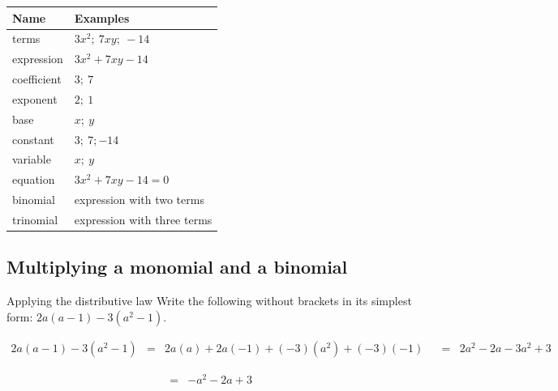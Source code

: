 \begin{table}[H]
\begin{center}
\begin{tabular}{|l|l|}
\hline
\textbf{Name} & \textbf{Examples} \\
\hline
terms & $3x^2;~ 7xy;~ -14$\\ \hline
expression & $3x^2 + 7xy -14$\\ \hline
coefficient & $3;~7$\\ \hline
exponent & $2;~1$\\ \hline
base & $x;~y$\\ \hline
constant & $3;~7;-14$\\ \hline
variable & $x;~ y$\\ \hline
equation & $3x^2 + 7xy -14 = 0$\\ \hline
binomial & expression with two terms\\ \hline
trinomial & expression with three terms \\ \hline


\end{tabular}
\end{center}
\end{table} 

\par

\subsection*{Multiplying a monomial and a binomial}

\begin{wex}{Applying the distributive law}
{Write the following without brackets in its simplest form: $2a(a-1) - 3(a^{2}-1).$}
{
\begin{equation*}
\begin{array}{lll} 2a(a-1) -3(a^{2}-1) &=& 2a(a) + 2a(-1) + (-3)(a^{2})+(-3)(-1) &
&=& 2a^{2} - 2a - 3a^{2} + 3
\end{array}
\end{equation*}

\begin{equation*}
\begin{array}{lll} &=& -a^{2} -2a + 3 & 
\end{array}
\end{equation*}
}
\end{wex}

